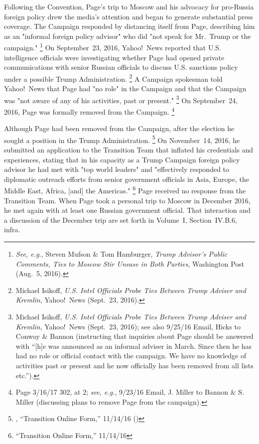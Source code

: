 Following the Convention, Page's trip to Moscow and his advocacy for pro-Russia foreign policy drew the media's attention and began to generate substantial press coverage.
The Campaign responded by distancing itself from Page, describing him as an "informal foreign policy advisor" who did "not speak for Mr.~Trump or the campaign."%
\footnote{\textit{See, e.g.}, Steven Mufson \& Tom Hamburger, \textit{Trump Advisor's Public Comments, Ties to Moscow Stir Unease in Both Parties}, Washington Post (Aug.~5, 2016).}
On September~23, 2016, Yahoo!\ News reported that U.S. intelligence officials were investigating whether Page had opened private communications with senior Russian officials to discuss U.S. sanctions policy under a possible Trump Administration.%
\footnote{Michael Isikoff, \textit{U.S. Intel Officials Probe Ties Between Trump Adviser and Kremlin}, Yahoo!\ News (Sept.~23, 2016).}
A Campaign spokesman told Yahoo!\ News that Page had "no role" in the Campaign and that the Campaign was "not aware of any of his activities, past or present."%
\footnote{Michael Isikoff, \textit{U.S. Intel Officials Probe Ties Between Trump Adviser and Kremlin}, Yahoo!\ News (Sept.~23, 2016);
see also 9/25/16 Email, Hicks to Conway \& Bannon (instructing that inquiries about Page should be answered with “[h]e was announced as an informal adviser in March.
Since then he has had no role or official contact with the campaign.
We have no knowledge of activities past or present and he now officially has been removed from all lists etc.”).}
On September~24, 2016, Page was formally removed from the Campaign.%
\footnote{Page 3/16/17 302, at 2;
\textit{see, e.g.}, 9/23/16 Email, J. Miller to Bannon \& S. Miller (discussing plans to remove Page from the campaign).}

Although Page had been removed from the Campaign, after the election he sought a position in the Trump Administration.%
\footnote{, “Transition Online Form,” 11/14/16 ()}
On November~14, 2016, he submitted an application to the Transition Team that inflated his credentials and experiences, stating that in his capacity as a Trump Campaign foreign policy advisor he had met with "top world leaders" and "effectively responded to diplomatic outreach efforts from senior government officials in Asia, Europe, the Middle East, Africa, [and] the Americas."%
\footnote{ “Transition Online Form,” 11/14/16 }
Page received no response from the Transition Team.
When Page took a personal trip to Moscow in December 2016, he met again with at least one Russian government official.
That interaction and a discussion of the December trip are set forth in Volume~I, Section~IV.B.6, infra.

